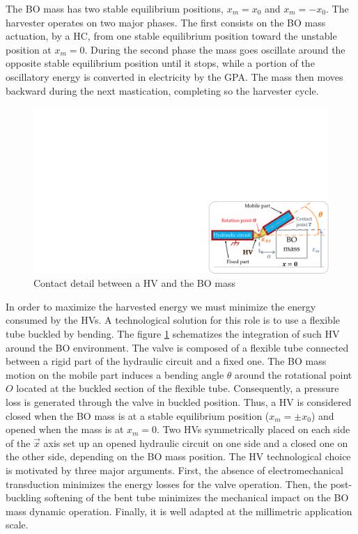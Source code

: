 \documentclass[3p,twocolumn,preprint]{elsarticle}
\begin{document}
The BO mass has two stable equilibrium positions, $x_m = x_0$ and $x_m = -x_0$. The harvester operates on two major phases. The first consists on the BO mass actuation, by a HC, from one stable equilibrium position toward the unstable position at $x_m = 0$. During the second phase the mass goes oscillate around the opposite stable equilibrium position until it stops, while a portion of the oscillatory energy is converted in electricity by the GPA. The mass then moves backward during the next mastication, completing so the harvester cycle.
\begin{figure}[!htbp]
	\centering
	\captionsetup{justification=centering}
	\includegraphics[trim={20cm 0cm 0cm 10.75cm},clip, width=\linewidth]{figures/HV_actuation_detail.pdf}
	\caption{Contact detail between a HV and the BO mass} 
	\label{fig:HV_actuation_detail}
\end{figure}

In order to maximize the harvested energy we must minimize the energy consumed by the HVs. A technological solution for this role is to use a flexible tube buckled by bending. The figure \ref{fig:HV_actuation_detail} schematizes the integration of such HV around the BO environment. The valve is composed of a flexible tube connected between a rigid part of the hydraulic circuit and a fixed one. The BO mass motion on the mobile part induces a bending angle $\theta$ around the rotational point $O$ located at the buckled section of the flexible tube. Consequently, a pressure loss is generated through the valve in buckled position. Thus, a HV is considered closed when the BO mass is at a stable equilibrium position ($x_m=\pm x_0$) and opened when the mass is at $x_m=0$. Two HVs symmetrically placed on each side of the $\vec{x}$ axis set up an opened hydraulic circuit on one side and a closed one on the other side, depending on the BO mass position. The HV technological choice is motivated by three major arguments. First, the absence of electromechanical transduction minimizes the energy losses for the valve operation. Then, the post-buckling softening of the bent tube minimizes the mechanical impact on the BO mass dynamic operation. Finally, it is well adapted at the millimetric application scale.
\end{document}

